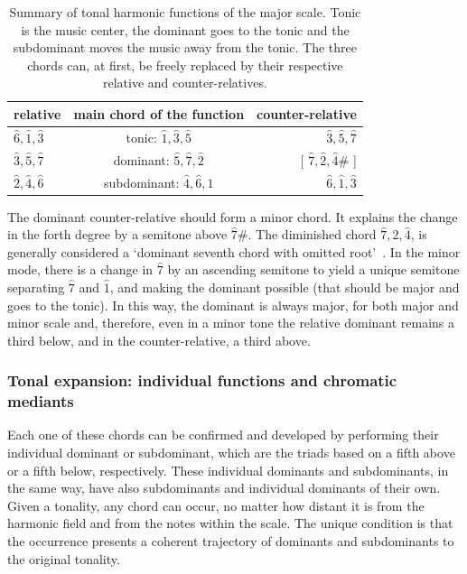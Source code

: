 \begin{table}[htp!]
\centering
\caption{Summary of tonal harmonic functions of the major scale. Tonic is the music center, the dominant goes to the tonic and the subdominant moves the music away from
the tonic. The three chords can, at first, be freely replaced by their
respective relative and counter-relatives.}
\begin{tabular}{l | c | r}
relative & main chord of the function & counter-relative \\\hline\hline
$\hat{6},\hat{1},\hat{3}$ & tonic:       $\hat{1},\hat{3},\hat{5}$ & $\hat{3}, \hat{5},      \hat{7}$ \\
$\hat{3},\hat{5},\hat{7}$ & dominant:    $\hat{5},\hat{7},\hat{2}$ & [ $\hat{7},\hat{2},\hat{4}\#$ ] \\
$\hat{2},\hat{4},\hat{6}$ & subdominant: $\hat{4},\hat{6},\hat{1}$ & $\hat{6},\hat{1},       \hat{3}$
\end{tabular}
\label{tab:harmonia}
\end{table}

The dominant counter-relative should form a minor chord. It explains the change in the forth degree by a semitone above $\hat{7}\#$. The diminished chord
$\hat{7},\hat{2},\hat{4}$, is generally considered a `dominant seventh chord with omitted root'~\cite{Koellheuteur}.
In the minor mode, there is a change in $\hat{7}$ by an ascending semitone to yield a unique semitone separating $\hat{7}$ and $\hat{1}$, and making the dominant possible (that should be major and goes to the tonic). In this way, the dominant is always major, for both major and minor scale and, therefore, even in a minor tone the relative dominant remains a third below, and in the counter-relative, a third above.


\subsubsection{Tonal expansion: individual functions and chromatic mediants}


Each one of these chords can be confirmed and developed by performing their individual dominant or subdominant, which are the triads based
on a fifth above or a fifth below, respectively. These individual dominants and subdominants,
in the same way, have also subdominants and individual dominants of their own. Given a tonality, any chord can occur, no matter
how distant it is from the harmonic field and from the notes within the scale. The unique condition is that the occurrence presents a coherent trajectory of dominants and subdominants to the original tonality.

